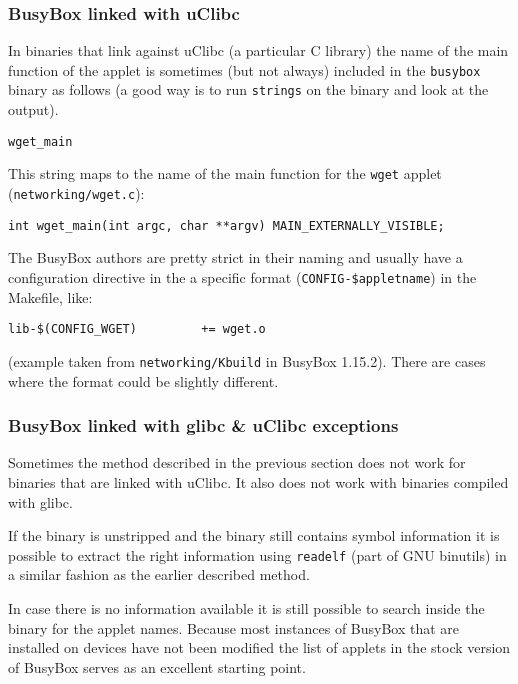 \documentclass[10pt]{article}
\begin{document}
\subsubsection{BusyBox linked with uClibc}

In binaries that link against uClibc (a particular C library) the name of the
main function of the applet is sometimes (but not always) included in the
\texttt{busybox} binary as follows (a good way is to run \texttt{strings} on
the binary and look at the output).

\begin{verbatim}
wget_main
\end{verbatim}

This string maps to the name of the main function for the \texttt{wget} applet
(\texttt{networking/wget.c}):

\begin{verbatim}
int wget_main(int argc, char **argv) MAIN_EXTERNALLY_VISIBLE;
\end{verbatim}

The BusyBox authors are pretty strict in their naming and usually have a
configuration directive in the a specific format
(\texttt{CONFIG-\$appletname}) in the Makefile, like:

\begin{verbatim}
lib-$(CONFIG_WGET)         += wget.o
\end{verbatim}

(example taken from \texttt{networking/Kbuild} in BusyBox 1.15.2). There are
cases where the format could be slightly different.

\subsubsection{BusyBox linked with glibc \& uClibc exceptions}

Sometimes the method described in the previous section does not work for
binaries that are linked with uClibc. It also does not work with binaries
compiled with glibc.

If the binary is unstripped and the binary still contains symbol information
it is possible to extract the right information using \texttt{readelf} (part
of GNU binutils) in a similar fashion as the earlier described method.

In case there is no information available it is still possible to search inside
the binary for the applet names. Because most instances of BusyBox that are
installed on devices have not been modified the list of applets in the stock
version of BusyBox serves as an excellent starting point.
\end{document}
